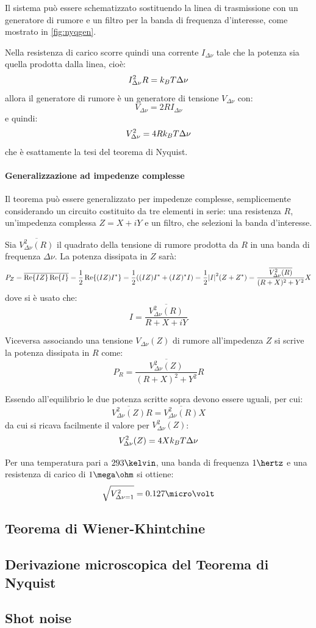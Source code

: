 Il sistema può essere schematizzato sostituendo la linea di trasmissione con un generatore di rumore e un filtro per la banda di frequenza d'interesse, come mostrato in \cref{fig:nyqgen}.

Nella resistenza di carico scorre quindi una corrente $ I_{\Delta\nu} $ tale che la potenza sia quella prodotta dalla linea, cioè:
\[ I_{\Delta\nu}^2 R = k_B T \Delta\nu \]
allora il generatore di rumore è un generatore di tensione $ V_{\Delta\nu} $ con:
\[ V_{\Delta\nu} = 2 R I_{\Delta\nu} \]
e quindi:
\[ V_{\Delta\nu}^2 = 4 R k_B T \Delta\nu \]
che è esattamente la tesi del teorema di Nyquist.

\paragraph{Generalizzazione ad impedenze complesse} Il teorema può essere generalizzato per impedenze complesse, semplicemente considerando un circuito costituito da tre elementi in serie: una resistenza $ R $, un'impedenza complessa $ Z = X + i Y $ e un filtro, che selezioni la banda d'interesse.

Sia $ \overline{V_{\Delta\nu}^2(R)} $ il quadrato della tensione di rumore prodotta da $ R $ in una banda di frequenza $ \Delta\nu $. La potenza dissipata in $ Z $ sarà:
\[ P_Z = \overline{\Re\{IZ\} \Re\{I\}} = \frac{1}{2} \Re\{(IZ) I^\ast\} = \frac{1}{2} ((IZ) I^\ast + (IZ)^\ast I) = \frac{1}{2}\abs{I}^2 (Z + Z^\ast) = \frac{\overline{V_{\Delta\nu}^2(R)}}{(R+X)^2 + Y^2}X\]
dove si è usato che:
\[ I = \frac{\overline{V_{\Delta\nu}^2(R)}}{R + X +iY} \]

Viceversa associando una tensione $ V_{\Delta\nu}(Z) $ di rumore all'impedenza $ Z $ si scrive la potenza dissipata in $ R $ come:
\[  P_R = \frac{\overline{V_{\Delta\nu}^2(Z)}}{(R+X)^2 + Y^2}R \]

Essendo all'equilibrio le due potenza scritte sopra devono essere uguali, per cui:
\[ \overline{V_{\Delta\nu}^2(Z)} R = \overline{V_{\Delta\nu}^2(R)} X \]
da cui si ricava facilmente il valore per $ \overline{V_{\Delta\nu}^2(Z)} $:
\[ V_{\Delta\nu}^2(Z) = 4 X k_B T \Delta\nu\]

\begin{es}
	Per una temperatura pari a $ 293 \kelvin $, una banda di frequenza $ 1 \hertz $ e una resistenza di carico di $ 1 \mega\ohm $ si ottiene:
	\[ \sqrt{V_{\Delta\nu = 1}^2} = 0.127 \micro\volt \]
\end{es}

\subsection{Teorema di Wiener-Khintchine}

\subsection{Derivazione microscopica del Teorema di Nyquist}

\subsection{Shot noise}